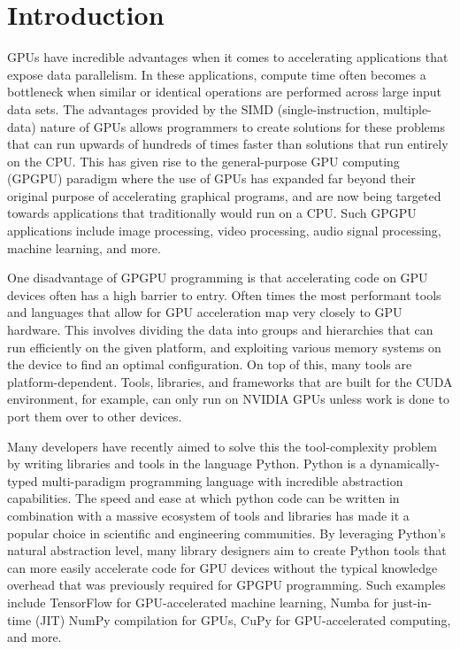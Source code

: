 \chapter{Introduction}

GPUs have incredible advantages when it comes to accelerating applications that expose data parallelism. In these applications, compute time often becomes a bottleneck when similar or identical operations are performed across large input data sets. The advantages provided by the SIMD (single-instruction, multiple-data) nature of GPUs allows programmers to create solutions for these problems that can run upwards of hundreds of times faster than solutions that run entirely on the CPU. This has given rise to the general-purpose GPU computing (GPGPU) paradigm where the use of GPUs has expanded far beyond their original purpose of accelerating graphical programs, and are now being targeted towards applications that traditionally would run on a CPU. Such GPGPU applications include image processing, video processing, audio signal processing, machine learning, and more.

\quad One disadvantage of GPGPU programming is that accelerating code on GPU devices often has a high barrier to entry. Often times the most performant tools and languages that allow for GPU acceleration map very closely to GPU hardware. This involves dividing the data into groups and hierarchies that can run efficiently on the given platform, and exploiting various memory systems on the device to find an optimal configuration. On top of this, many tools are platform-dependent. Tools, libraries, and frameworks that are built for the CUDA environment, for example, can only run on NVIDIA GPUs unless work is done to port them over to other devices.

\quad Many developers have recently aimed to solve this the tool-complexity problem by writing libraries and tools in the language Python. Python is a dynamically-typed multi-paradigm programming language with incredible abstraction capabilities. The speed and ease at which python code can be written in combination with a massive ecosystem of tools and libraries has made it a popular choice in scientific and engineering communities. By leveraging Python's natural abstraction level, many library designers aim to create Python tools that can more easily accelerate code for GPU devices without the typical knowledge overhead that was previously required for GPGPU programming. Such examples include TensorFlow for GPU-accelerated machine learning, Numba for just-in-time (JIT) NumPy compilation for GPUs, CuPy for GPU-accelerated computing, and more.


